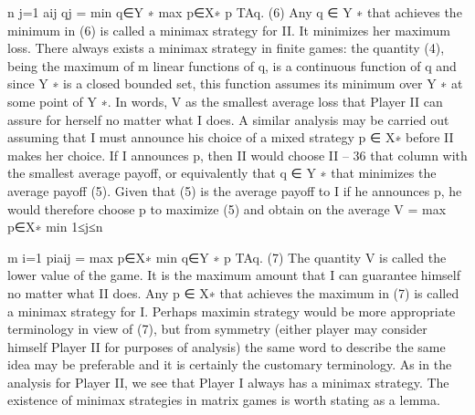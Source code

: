 n
j=1
aij qj = min
q∈Y ∗ max
p∈X∗ p
TAq. (6)
Any q ∈ Y ∗ that achieves the minimum in (6) is called a minimax strategy for II. It
minimizes her maximum loss. There always exists a minimax strategy in finite games: the
quantity (4), being the maximum of m linear functions of q, is a continuous function of q
and since Y ∗ is a closed bounded set, this function assumes its minimum over Y ∗ at some
point of Y ∗.
In words, V as the smallest average loss that Player II can assure for herself no matter
what I does.
A similar analysis may be carried out assuming that I must announce his choice of a
mixed strategy p ∈ X∗ before II makes her choice. If I announces p, then II would choose
II – 36
that column with the smallest average payoff, or equivalently that q ∈ Y ∗ that minimizes
the average payoff (5). Given that (5) is the average payoff to I if he announces p, he
would therefore choose p to maximize (5) and obtain on the average
V = max
p∈X∗ min
1≤j≤n

m
i=1
piaij = max
p∈X∗ min
q∈Y ∗ p
TAq. (7)
The quantity V is called the lower value of the game. It is the maximum amount that I can
guarantee himself no matter what II does. Any p ∈ X∗ that achieves the maximum in (7)
is called a minimax strategy for I. Perhaps maximin strategy would be more appropriate
terminology in view of (7), but from symmetry (either player may consider himself Player
II for purposes of analysis) the same word to describe the same idea may be preferable
and it is certainly the customary terminology. As in the analysis for Player II, we see that
Player I always has a minimax strategy. The existence of minimax strategies in matrix
games is worth stating as a lemma.

